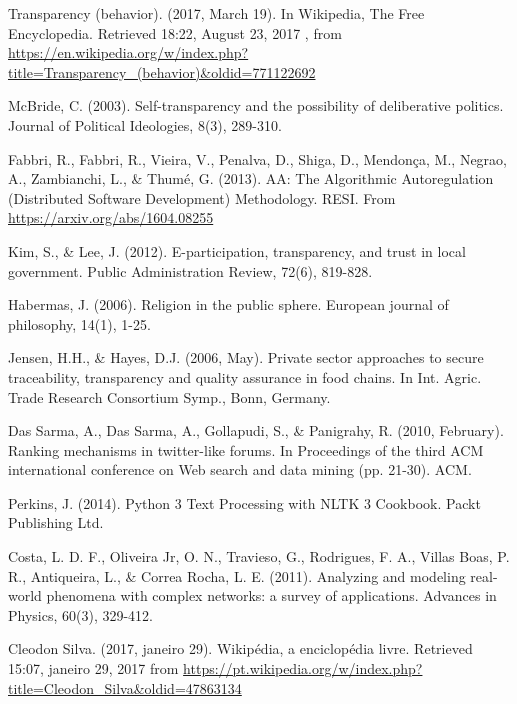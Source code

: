 \documentclass[12pt,fleqn]{article}
\begin{document}
\begin{thebibliography}{99}
\fontsize{11}{0}\selectfont
{}
	Transparency (behavior). (2017, March 19). In Wikipedia, The Free Encyclopedia. Retrieved
		18:22, August 23, 2017
		, from \url{https://en.wikipedia.org/w/index.php?title=Transparency_(behavior)&oldid=771122692}

McBride, C. (2003). Self-transparency and the possibility of deliberative politics. Journal of Political Ideologies, 8(3), 289-310.

	Fabbri, R., Fabbri, R., Vieira, V., Penalva, D., Shiga, D., Mendonça, M., Negrao, A., Zambianchi, L., \& Thumé, G. (2013). AA: The Algorithmic Autoregulation (Distributed Software Development) Methodology. RESI. From \url{https://arxiv.org/abs/1604.08255}

Kim, S., \& Lee, J. (2012). E-participation, transparency, and trust in local government. Public Administration Review, 72(6), 819-828.

 Habermas, J. (2006). Religion in the public sphere. European journal of philosophy, 14(1), 1-25.

Jensen, H.H., \& Hayes, D.J. (2006, May). Private sector approaches to secure traceability, transparency and quality assurance in food chains. In Int. Agric. Trade Research Consortium Symp., Bonn, Germany.

Das Sarma, A., Das Sarma, A., Gollapudi, S., \& Panigrahy, R. (2010, February). Ranking mechanisms in twitter-like forums. In Proceedings of the third ACM international conference on Web search and data mining (pp. 21-30). ACM.

Perkins, J. (2014). Python 3 Text Processing with NLTK 3 Cookbook. Packt Publishing Ltd.

Costa, L. D. F., Oliveira Jr, O. N., Travieso, G., Rodrigues, F. A., Villas Boas, P. R., Antiqueira, L., \& Correa Rocha, L. E. (2011). Analyzing and modeling real-world phenomena with complex networks: a survey of applications. Advances in Physics, 60(3), 329-412.

	Cleodon Silva. (2017, janeiro 29). Wikipédia, a enciclopédia livre. Retrieved 15:07, janeiro 29, 2017 from \url{https://pt.wikipedia.org/w/index.php?title=Cleodon_Silva&oldid=47863134}


\end{thebibliography}
\end{document}
